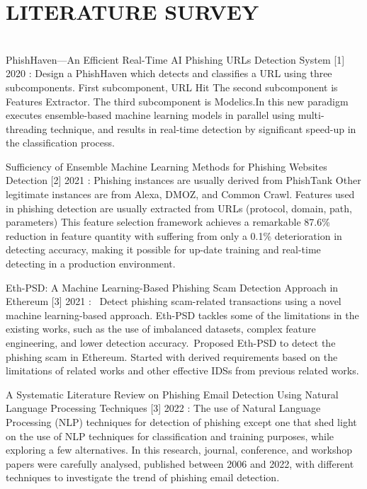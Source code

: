 \chapter{LITERATURE SURVEY}
\thispagestyle{empty}
\\
\hspace{.2cm} PhishHaven—An Efficient Real-Time AI Phishing URLs Detection System [1] 2020 : Design a PhishHaven which detects and classifies a URL using three subcomponents.
First subcomponent, URL Hit 
The second subcomponent is Features Extractor.
The third subcomponent is Modelics.In this new paradigm executes ensemble-based machine learning models in parallel using multi-threading technique, and results in real-time detection by significant speed-up in the classification process. 

\hspace{.2cm}Sufficiency of Ensemble Machine Learning Methods for Phishing Websites Detection [2] 2021 : Phishing instances are usually derived from PhishTank
Other legitimate instances are from Alexa, DMOZ, and Common Crawl.
Features used in phishing detection are usually extracted from URLs (protocol, domain, path, parameters) This feature selection framework achieves a remarkable 87.6\% reduction in feature quantity with suffering from only a 0.1\% deterioration in detecting accuracy, making it possible for up-date training and real-time detecting in a production environment.

\hspace{.2cm} Eth-PSD: A Machine Learning-Based Phishing Scam Detection Approach in Ethereum
[3] 2021 :  Detect phishing scam-related transactions using a novel machine learning-based approach. Eth-PSD tackles some of the limitations in the existing works, such as the use of imbalanced datasets, complex feature engineering, and lower detection accuracy. Proposed Eth-PSD to detect the phishing scam in Ethereum. Started with derived requirements based on the limitations of related works and other effective IDSs from previous related works.


\hspace{.2cm} A Systematic Literature Review on Phishing Email Detection Using Natural Language Processing Techniques
[3] 2022 : The use of Natural Language Processing (NLP) techniques for detection of phishing except one that shed light on the use of NLP techniques for classification and training purposes, while exploring a few alternatives. In this research, journal, conference, and workshop papers were carefully analysed, published between 2006 and 2022, with different techniques to investigate the trend of phishing email detection.

